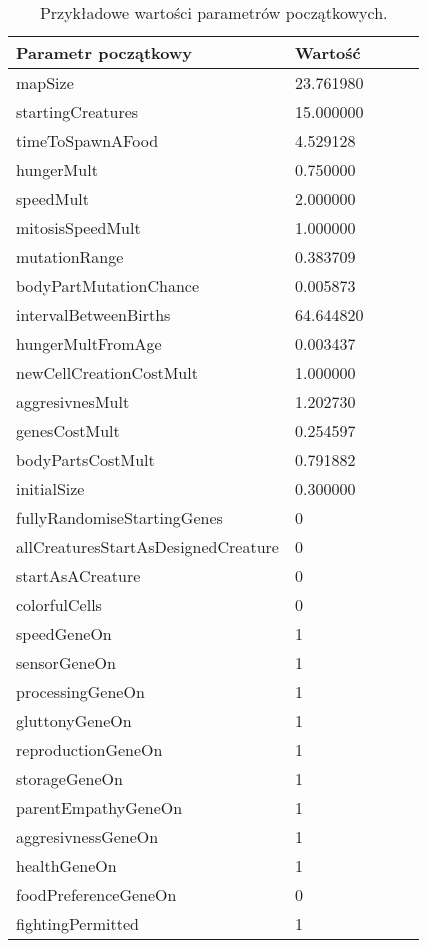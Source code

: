 \documentclass{article}
\begin{document}
\begin{table}[H]
    \begin{tabular}{lllll}
        \toprule
        \textbf{Parametr początkowy} & \textbf{Wartość} \\
        \midrule
        mapSize                             & 23.761980 \\
        startingCreatures                   & 15.000000 \\
        timeToSpawnAFood                    & 4.529128  \\
        hungerMult                          & 0.750000  \\
        speedMult                           & 2.000000  \\
        mitosisSpeedMult                    & 1.000000  \\
        mutationRange                       & 0.383709  \\
        bodyPartMutationChance              & 0.005873  \\
        intervalBetweenBirths               & 64.644820 \\
        hungerMultFromAge                   & 0.003437  \\
        newCellCreationCostMult             & 1.000000  \\
        aggresivnesMult                     & 1.202730  \\
        genesCostMult                       & 0.254597  \\
        bodyPartsCostMult                   & 0.791882  \\
        initialSize                         & 0.300000  \\
        fullyRandomiseStartingGenes         & 0  \\
        allCreaturesStartAsDesignedCreature & 0  \\
        startAsACreature                    & 0  \\
        colorfulCells                       & 0  \\
        speedGeneOn                         & 1  \\
        sensorGeneOn                        & 1  \\
        processingGeneOn                    & 1  \\
        gluttonyGeneOn                      & 1  \\
        reproductionGeneOn                  & 1  \\
        storageGeneOn                       & 1  \\
        parentEmpathyGeneOn                 & 1  \\
        aggresivnessGeneOn                  & 1  \\
        healthGeneOn                        & 1  \\
        foodPreferenceGeneOn                & 0  \\
        fightingPermitted                   & 1  \\
         \bottomrule
    \end{tabular}
    \caption{Przykładowe wartości parametrów początkowych.}
\end{table}
\end{document}

